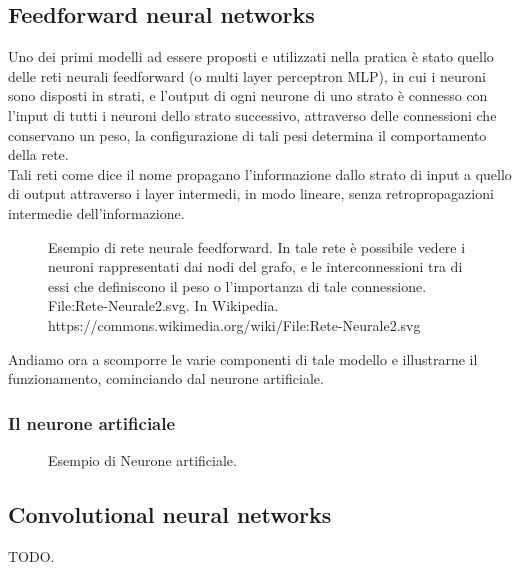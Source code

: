 \subsection{Feedforward neural networks}
Uno dei primi modelli ad essere proposti e utilizzati nella pratica è stato quello delle reti neurali feedforward (o multi layer perceptron MLP),
in cui i neuroni sono disposti in strati, e l'output di ogni neurone di uno strato è connesso con l'input di tutti i neuroni dello strato successivo, 
attraverso delle connessioni che conservano un peso, la configurazione di tali pesi determina il comportamento della rete.\\
Tali reti come dice il nome propagano l'informazione dallo strato di input a quello di output attraverso i layer intermedi,
in modo lineare, senza retropropagazioni intermedie dell'informazione.\\

    \begin{figure}[H]
        \centering
        
        \caption{Esempio di rete neurale feedforward. In tale rete è possibile vedere i neuroni rappresentati dai nodi del grafo, e
        le interconnessioni tra di essi che definiscono il peso o l'importanza di tale connessione.\\
        File:Rete-Neurale2.svg. In Wikipedia. https://commons.wikimedia.org/wiki/File:Rete-Neurale2.svg}
        \label{fig:feedforward_nn}
    \end{figure}

Andiamo ora a scomporre le varie componenti di tale modello e illustrarne il funzionamento, cominciando dal neurone artificiale.

\subsubsection{Il neurone artificiale}

    \begin{figure}[H]
        \centering
        
        \caption{Esempio di Neurone artificiale.}
        \label{fig:artificial_neuron}
    \end{figure}

\subsection{Convolutional neural networks}

    TODO.